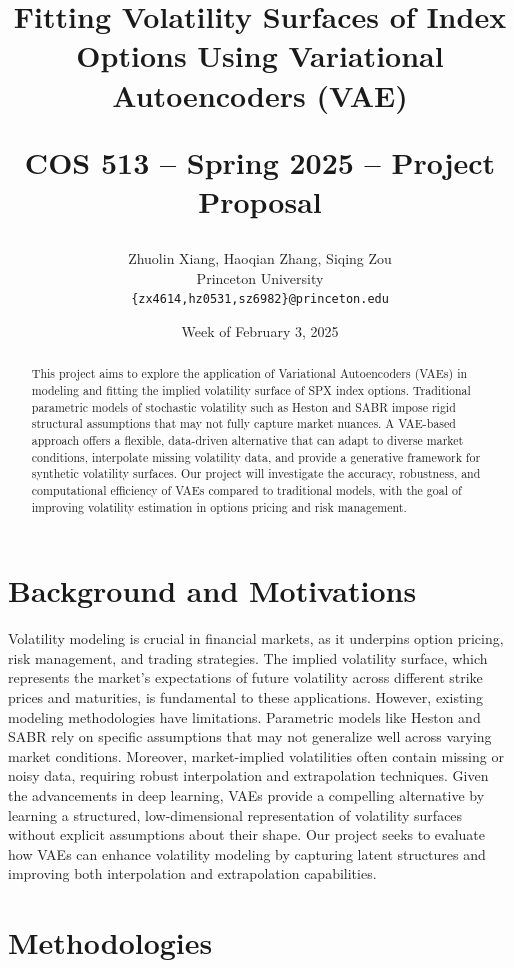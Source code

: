 \documentclass{article}
\title{Fitting Volatility Surfaces of Index Options Using Variational Autoencoders (VAE)\\
\begin{large}
COS 513 -- Spring 2025 -- Project Proposal
\end{large} }
\author{Zhuolin Xiang, Haoqian Zhang, Siqing Zou \\
Princeton University \\
\texttt{\{zx4614,hz0531,sz6982\}@princeton.edu}}
\date{Week of February 3, 2025}
\begin{document}
\maketitle
\begin{abstract}
    This project aims to explore the application of Variational Autoencoders (VAEs) in modeling and fitting the implied volatility surface of SPX index options. Traditional parametric models of stochastic volatility such as Heston and SABR impose rigid structural assumptions that may not fully capture market nuances. A VAE-based approach offers a flexible, data-driven alternative that can adapt to diverse market conditions, interpolate missing volatility data, and provide a generative framework for synthetic volatility surfaces. Our project will investigate the accuracy, robustness, and computational efficiency of VAEs compared to traditional models, with the goal of improving volatility estimation in options pricing and risk management.
\end{abstract}

\section{Background and Motivations}


Volatility modeling is crucial in financial markets, as it underpins option pricing, risk management, and trading strategies. The implied volatility surface, which represents the market's expectations of future volatility across different strike prices and maturities, is fundamental to these applications. However, existing modeling methodologies have limitations. Parametric models like Heston and SABR rely on specific assumptions that may not generalize well across varying market conditions. Moreover, market-implied volatilities often contain missing or noisy data, requiring robust interpolation and extrapolation techniques. Given the advancements in deep learning, VAEs provide a compelling alternative by learning a structured, low-dimensional representation of volatility surfaces without explicit assumptions about their shape. Our project seeks to evaluate how VAEs can enhance volatility modeling by capturing latent structures and improving both interpolation and extrapolation capabilities.

\section{Methodologies}
\end{document}
